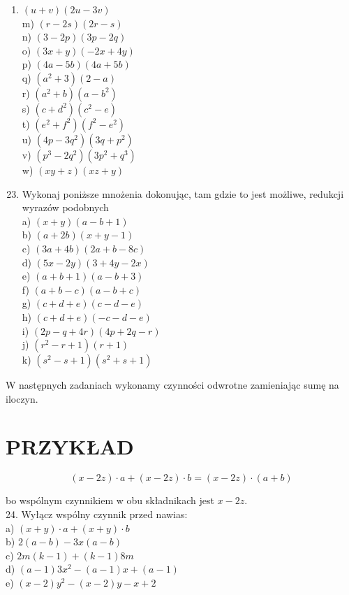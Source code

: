 \documentclass[10pt]{article}
\begin{document}
\begin{enumerate}
  \item \((u+v)(2 u-3 v)\)\\
m) \((r-2 s)(2 r-s)\)\\
n) \((3-2 p)(3 p-2 q)\)\\
o) \((3 x+y)(-2 x+4 y)\)\\
p) \((4 a-5 b)(4 a+5 b)\)\\
q) \(\left(a^{2}+3\right)(2-a)\)\\
r) \(\left(a^{2}+b\right)\left(a-b^{2}\right)\)\\
s) \(\left(c+d^{2}\right)\left(c^{2}-e\right)\)\\
t) \(\left(e^{2}+f^{2}\right)\left(f^{2}-e^{2}\right)\)\\
u) \(\left(4 p-3 q^{2}\right)\left(3 q+p^{2}\right)\)\\
v) \(\left(p^{3}-2 q^{2}\right)\left(3 p^{2}+q^{3}\right)\)\\
w) \((x y+z)(x z+y)\)
\end{enumerate}

\begin{enumerate}
  \setcounter{enumi}{22}
  \item Wykonaj poniższe mnożenia dokonując, tam gdzie to jest możliwe, redukcji wyrazów podobnych\\
a) \((x+y)(a-b+1)\)\\
b) \((a+2 b)(x+y-1)\)\\
c) \((3 a+4 b)(2 a+b-8 c)\)\\
d) \((5 x-2 y)(3+4 y-2 x)\)\\
e) \((a+b+1)(a-b+3)\)\\
f) \((a+b-c)(a-b+c)\)\\
g) \((c+d+e)(c-d-e)\)\\
h) \((c+d+e)(-c-d-e)\)\\
i) \((2 p-q+4 r)(4 p+2 q-r)\)\\
j) \(\left(r^{2}-r+1\right)(r+1)\)\\
k) \(\left(s^{2}-s+1\right)\left(s^{2}+s+1\right)\)
\end{enumerate}

W następnych zadaniach wykonamy czynności odwrotne zamieniając sumę na iloczyn.

\section*{PRZYKŁAD}
\[
(x-2 z) \cdot a+(x-2 z) \cdot b=(x-2 z) \cdot(a+b)
\]

bo wspólnym czynnikiem w obu składnikach jest \(x-2 z\).\\
24. Wyłącz wspólny czynnik przed nawias:\\
a) \((x+y) \cdot a+(x+y) \cdot b\)\\
b) \(2(a-b)-3 x(a-b)\)\\
c) \(2 m(k-1)+(k-1) 8 m\)\\
d) \((a-1) 3 x^{2}-(a-1) x+(a-1)\)\\
e) \((x-2) y^{2}-(x-2) y-x+2\)
\end{document}
